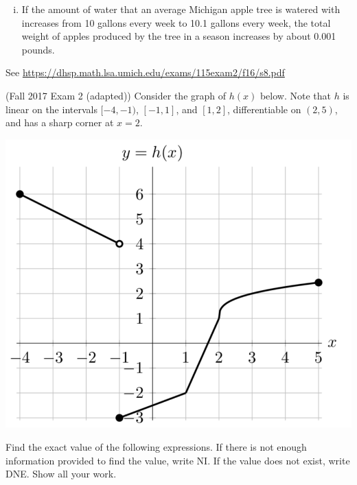\documentclass[11pt]{exam}
\begin{document}
\begin{questions}
\begin{enumerate}[(a)]
\begin{enumerate}[(i)]
	\item If the amount of water that an average Michigan apple tree is watered with increases from 10 gallons every week to 10.1 gallons every week, the total weight of apples produced by the tree in a season increases by about 0.001 pounds.
	\end{enumerate}
	\end{enumerate}
        \begin{solution}
          See \href{https://dhsp.math.lsa.umich.edu/exams/115exam2/f16/s8.pdf}{https://dhsp.math.lsa.umich.edu/exams/115exam2/f16/s8.pdf}
        \end{solution}
      \question (Fall 2017 Exam 2 (adapted)) %
        Consider the graph of $h(x)$ below. Note that $h$ is linear on the intervals $[-4, -1)$, $[-1, 1]$, and $[1, 2]$, differentiable on $(2, 5)$, and has a sharp corner at $x = 2$.\\
        \begin{minipage}{0.5\linewidth}
          \begin{center}
            \includegraphics[scale=0.5]{graphh.png}
          \end{center}
        \end{minipage}
        \begin{minipage}{0.5\linewidth}
          Find the exact value of the following expressions. If there
          is not enough information provided to find the value, write
          NI. If the value does not exist, write DNE. Show all your
          work.
            \begin{enumerate}[(a)]

\end{enumerate}
\end{minipage}
\end{questions}
\end{document}
